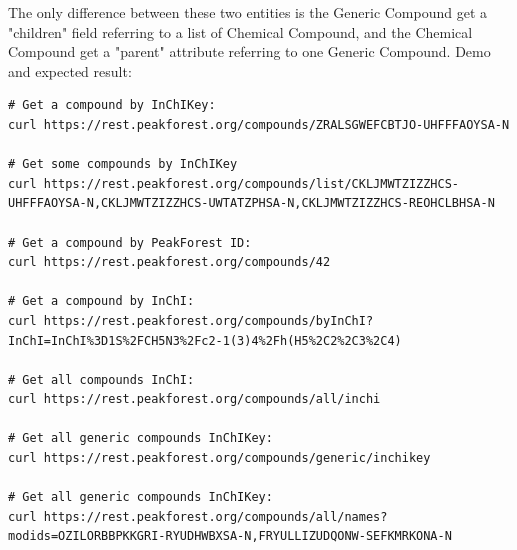 \begin{figure}[htbp]
	\centering
\end{figure}

The only difference between these two entities is the Generic Compound get a "children" field referring to a list of Chemical Compound, and the Chemical Compound get a "parent" attribute referring to one Generic Compound.
\newline
\hspace*{\parindent}
Demo and expected result:
	\begin{lstlisting}[language=custombash,caption={Compound request Demo},label=compoundDemo]
# Get a compound by InChIKey: 
curl https://rest.peakforest.org/compounds/ZRALSGWEFCBTJO-UHFFFAOYSA-N

# Get some compounds by InChIKey
curl https://rest.peakforest.org/compounds/list/CKLJMWTZIZZHCS-UHFFFAOYSA-N,CKLJMWTZIZZHCS-UWTATZPHSA-N,CKLJMWTZIZZHCS-REOHCLBHSA-N

# Get a compound by PeakForest ID: 
curl https://rest.peakforest.org/compounds/42

# Get a compound by InChI: 
curl https://rest.peakforest.org/compounds/byInChI?InChI=InChI%3D1S%2FCH5N3%2Fc2-1(3)4%2Fh(H5%2C2%2C3%2C4)

# Get all compounds InChI: 
curl https://rest.peakforest.org/compounds/all/inchi

# Get all generic compounds InChIKey: 
curl https://rest.peakforest.org/compounds/generic/inchikey

# Get all generic compounds InChIKey: 
curl https://rest.peakforest.org/compounds/all/names?modids=OZILORBBPKKGRI-RYUDHWBXSA-N,FRYULLIZUDQONW-SEFKMRKONA-N

	\end{lstlisting}

